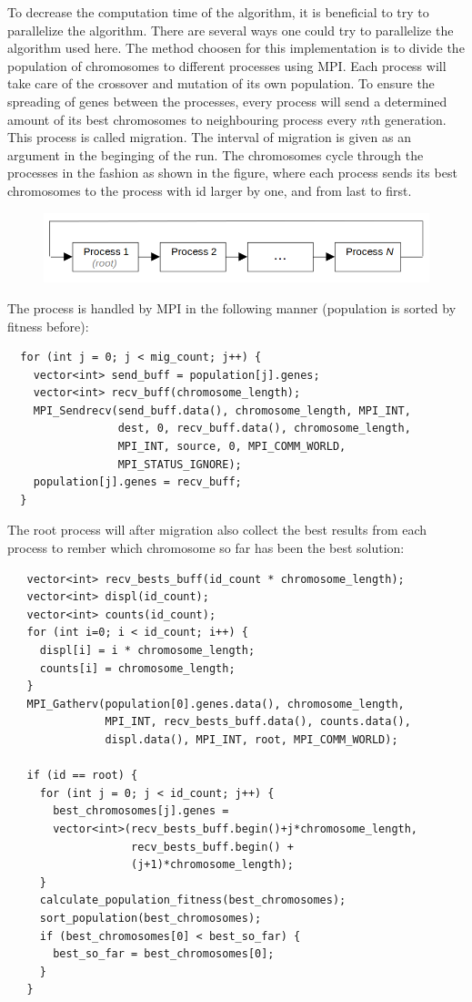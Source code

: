 \documentclass[12pt]{article}
\begin{document}
To decrease the computation time of the algorithm, it is beneficial to try to parallelize the
algorithm. There are several ways one could try to parallelize the algorithm used here. The method
choosen for this implementation is to divide the population of chromosomes to different processes
using MPI. Each process will take care of the crossover and mutation of its own population. To
ensure the spreading of genes between the processes, every process will send a determined amount of
its best chromosomes to neighbouring process every $n$th generation. This process is called
migration. The interval of migration is given as
an argument in the beginging of the run. The chromosomes cycle through the processes in the fashion
as shown in the figure, where each process sends its best chromosomes to the process with id
larger by one, and from last to first.
\begin{figure}[h]
  \includegraphics[scale=0.475]{migration.png}
\end{figure}

The process is handled by MPI in the following manner (population is sorted by fitness before):
\begin{lstlisting}
  for (int j = 0; j < mig_count; j++) {
    vector<int> send_buff = population[j].genes;
    vector<int> recv_buff(chromosome_length);
    MPI_Sendrecv(send_buff.data(), chromosome_length, MPI_INT,
                 dest, 0, recv_buff.data(), chromosome_length,
                 MPI_INT, source, 0, MPI_COMM_WORLD,
                 MPI_STATUS_IGNORE);
    population[j].genes = recv_buff;
  }
\end{lstlisting}

The root process will after migration also collect the best results from each process to rember
which chromosome so far has been the best solution:
\newpage
\begin{lstlisting}
   vector<int> recv_bests_buff(id_count * chromosome_length);
   vector<int> displ(id_count);
   vector<int> counts(id_count);
   for (int i=0; i < id_count; i++) {
     displ[i] = i * chromosome_length;
     counts[i] = chromosome_length;
   }
   MPI_Gatherv(population[0].genes.data(), chromosome_length,
               MPI_INT, recv_bests_buff.data(), counts.data(),
               displ.data(), MPI_INT, root, MPI_COMM_WORLD);
      
   if (id == root) {
     for (int j = 0; j < id_count; j++) {
       best_chromosomes[j].genes =
       vector<int>(recv_bests_buff.begin()+j*chromosome_length,
                   recv_bests_buff.begin() +
                   (j+1)*chromosome_length);
     }
     calculate_population_fitness(best_chromosomes);
     sort_population(best_chromosomes);
     if (best_chromosomes[0] < best_so_far) {
       best_so_far = best_chromosomes[0];
     }
   }
 \end{lstlisting}
\end{document}
